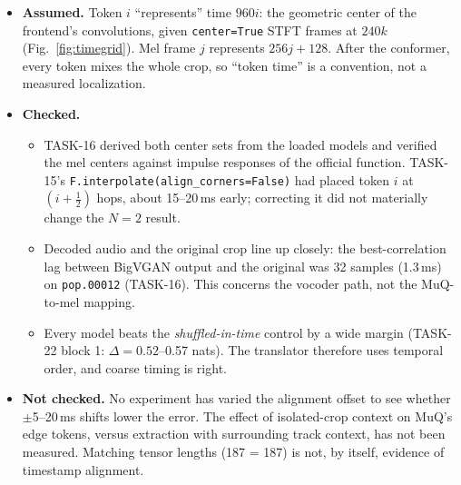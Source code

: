 \documentclass[10pt,letterpaper]{article}
\begin{document}
\begin{itemize}
\item \textbf{Assumed.} Token $i$ ``represents'' time $960i$: the geometric center of the frontend's convolutions, given \texttt{center=True} STFT frames at $240k$ (Fig.~\ref{fig:timegrid}). Mel frame $j$ represents $256j+128$. After the conformer, every token mixes the whole crop, so ``token time'' is a convention, not a measured localization.
\item \textbf{Checked.}
  \begin{itemize}
  \item TASK-16 derived both center sets from the loaded models and verified the mel centers against impulse responses of the official function. TASK-15's \texttt{F.interpolate(align\_corners=False)} had placed token $i$ at $(i+\tfrac12)$ hops, about 15--20\,ms early; correcting it did not materially change the $N{=}2$ result.
  \item Decoded audio and the original crop line up closely: the best-correlation lag between BigVGAN output and the original was 32 samples (1.3\,ms) on \texttt{pop.00012} (TASK-16). This concerns the vocoder path, not the MuQ-to-mel mapping.
  \item Every model beats the \emph{shuffled-in-time} control by a wide margin (TASK-22 block 1: $\Delta=0.52$--0.57 nats). The translator therefore uses temporal order, and coarse timing is right.
  \end{itemize}
\item \textbf{Not checked.} No experiment has varied the alignment offset to see whether $\pm$5--20\,ms shifts lower the error. The effect of isolated-crop context on MuQ's edge tokens, versus extraction with surrounding track context, has not been measured. Matching tensor lengths (187 = 187) is not, by itself, evidence of timestamp alignment.
\end{itemize}
\end{document}
